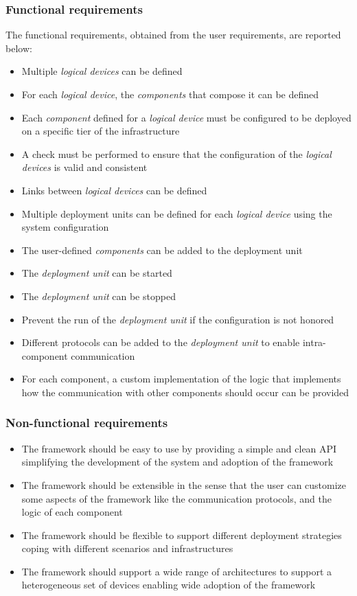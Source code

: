 \subsubsection{Functional requirements}
\label{sec:functional-requirements}

The functional requirements, obtained from the user requirements, are reported below:

\begin{itemize}
	\item Multiple \emph{logical devices} can be defined
	\item For each \emph{logical device}, the \emph{components} that compose it can be defined
	\item Each \emph{component} defined for a \emph{logical device} must be configured to be deployed on a specific tier of the infrastructure
	\item A check must be performed to ensure that the configuration of the \emph{logical devices} is valid and consistent
	\item Links between \emph{logical devices} can be defined
	\item Multiple deployment units can be defined for each \emph{logical device} using the system configuration
	\item The user-defined \emph{components} can be added to the deployment unit
	\item The \emph{deployment unit} can be started
	\item The \emph{deployment unit} can be stopped
	\item Prevent the run of the \emph{deployment unit} if the configuration is not honored
	\item Different protocols can be added to the \emph{deployment unit} to enable intra-component communication
	\item For each component, a custom implementation of the logic that implements how the communication with other components should occur can be
	      provided
\end{itemize}

\subsubsection{Non-functional requirements}
\label{sec:non-functional-requirements}

\begin{itemize}
	\item The framework should be easy to use by providing a simple and clean API simplifying the development of the system and adoption of the
	      framework
	\item The framework should be extensible in the sense that the user can customize some aspects of the framework like the communication protocols,
	      and the logic of each component
	\item The framework should be flexible to support different deployment strategies coping with different scenarios and infrastructures
	\item The framework should support a wide range of architectures to support a heterogeneous set of devices enabling wide adoption of the
	      framework
\end{itemize}


